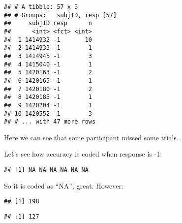 \documentclass[
]{article}
\newenvironment{Shaded}{\begin{snugshade}}{\end{snugshade}}
\newcommand{\CommentTok}[1]{\textcolor[rgb]{0.56,0.35,0.01}{\textit{#1}}}
\newcommand{\DecValTok}[1]{\textcolor[rgb]{0.00,0.00,0.81}{#1}}
\newcommand{\KeywordTok}[1]{\textcolor[rgb]{0.13,0.29,0.53}{\textbf{#1}}}
\newcommand{\NormalTok}[1]{#1}
\newcommand{\OperatorTok}[1]{\textcolor[rgb]{0.81,0.36,0.00}{\textbf{#1}}}
\newcommand{\StringTok}[1]{\textcolor[rgb]{0.31,0.60,0.02}{#1}}
\begin{document}
\begin{verbatim}
## # A tibble: 57 x 3
## # Groups:   subjID, resp [57]
##     subjID resp      n
##      <int> <fct> <int>
##  1 1414932 -1       10
##  2 1414933 -1        1
##  3 1414945 -1        3
##  4 1415040 -1        1
##  5 1420163 -1        2
##  6 1420165 -1        1
##  7 1420180 -1        2
##  8 1420185 -1        1
##  9 1420204 -1        1
## 10 1420552 -1        3
## # ... with 47 more rows
\end{verbatim}

Here we can see that some participant missed some trials.

Let's see how accuracy is coded when response is -1:

\begin{Shaded}
\end{Shaded}

\begin{verbatim}
## [1] NA NA NA NA NA NA
\end{verbatim}

So it is coded as ``NA'', great. However:

\begin{Shaded}
\end{Shaded}

\begin{verbatim}
## [1] 198
\end{verbatim}

\begin{Shaded}
\end{Shaded}

\begin{verbatim}
## [1] 127
\end{verbatim}
\end{document}
